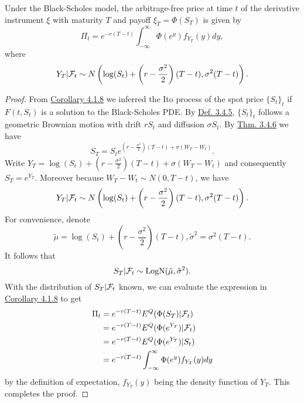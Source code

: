 \documentclass[11pt,fleqn]{book} %
\begin{document}
\begin{theorem} \label{thm:419}
Under the Black-Scholes model, the arbitrage-free price at time \(t\) of the derivative instrument \(\xi\) with maturity \(T\) and payoff \(\xi_T = \Phi(S_T)\) is given by
\[
\Pi_t = e^{-r(T - t)}\int_{-\infty}^\infty\Phi(e^y)f_{Y_T}(y)dy,
\]
where
\[
Y_T|\mathcal{F}_t \sim N\left(\log(S_t) + \left(r - \frac{\sigma^2}{2}\right)(T - t), \sigma^2(T - t)\right).
\]
\end{theorem}
\begin{proof}
From \hyperref[cor:418]{Corollary 4.1.8} we inferred the Ito process of the spot price \(\{S_t\}_t\) if \(F(t, S_t)\) is a solution to the Black-Scholes PDE. By \hyperref[def:345]{Def. 3.4.5}, \(\{S_t\}_t\) follows a geometric Brownian motion with drift \(rS_t\) and diffusion \(\sigma S_t\). By \hyperref[thm:346]{Thm. 3.4.6} we have
\[
S_T = S_te^{\left(r - \frac{\sigma^2}{2}\right)(T - t) + \sigma(W_T - W_t)}.
\]
\indent Write \(Y_T = \log(S_t) + \left(r - \frac{\sigma^2}{2}\right)(T - t) + \sigma(W_T - W_t)\) and consequently \(S_T = e^{Y_T}\). Moreover because \(W_T - W_t \sim N(0, T - t)\), we have
\[
Y_T | \mathcal{F}_t \sim N\left(\log(S_t) + \left(r - \frac{\sigma^2}{2}\right)(T - t), \sigma^2(T - t)\right).
\]
\indent For convenience, denote
\[
\tilde{\mu} = \log(S_t) + \left(r - \frac{\sigma^2}{2}\right)(T - t), \tilde{\sigma}^2 = \sigma^2(T - t).
\]
\indent It follows that
\[
S_T | \mathcal{F}_t \sim \operatorname{LogN}(\tilde{\mu}, \tilde{\sigma}^2).
\]
\indent With the distribution of \(S_T | \mathcal{F}_t\) known, we can evaluate the expression in \hyperref[cor:418]{Corollary 4.1.8} to get
\[
\begin{aligned}
\Pi_t &= e^{-r(T - t)}E^Q(\Phi(S_T)|\mathcal{F}_t) \\
&= e^{-r(T - t)}E^Q(\Phi(e^{Y_T})|\mathcal{F}_t) \\
&= e^{-r(T - t)}E^Q(\Phi(e^{Y_T})|S_t) \\
&= e^{-r(T - t)}\int_{-\infty}^\infty\Phi(e^y)f_{Y_T}(y)dy
\end{aligned}
\]
by the definition of expectation, \(f_{Y_T}(y)\) being the density function of \(Y_T\). This completes the proof.
\end{proof}
\end{document}
